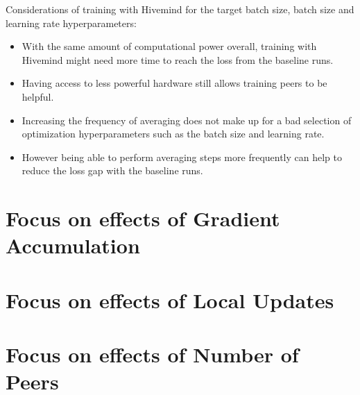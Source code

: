Considerations of training with Hivemind for the target batch size, batch size and learning rate hyperparameters:

\begin{itemize}
    \item With the same amount of computational power overall, training with Hivemind might need more time to reach the loss from the baseline runs.
    \item Having access to less powerful hardware still allows training peers to be helpful.
    \item Increasing the frequency of averaging does not make up for a bad selection of optimization hyperparameters such as the batch size and learning rate.
    \item However being able to perform averaging steps more frequently can help to reduce the loss gap with the baseline runs.
\end{itemize}

\section{Focus on effects of Gradient Accumulation}

\section{Focus on effects of Local Updates}

\section{Focus on effects of Number of Peers}

